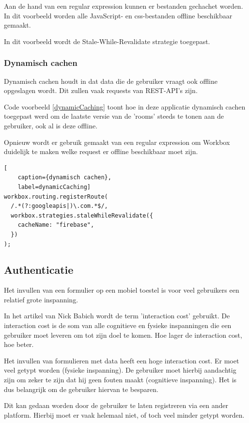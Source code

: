 			Aan de hand van een regular expression kunnen er bestanden gechachet worden. In dit voorbeeld worden alle JavaScript- en css-bestanden offline beschikbaar gemaakt.
			
			In dit voorbeeld wordt de Stale-While-Revalidate strategie toegepast.
			\autocite{Workbox2020b}
			
		\subsubsection{Dynamisch cachen}
			Dynamisch cachen houdt in dat data die de gebruiker vraagt ook offline opgeslagen wordt. Dit zullen vaak requests van REST-API's zijn.
			
			Code voorbeeld \ref{dynamicCaching} toont hoe in deze applicatie dynamisch cachen toegepast werd om de laatste versie van de 'rooms' steeds te tonen aan de gebruiker, ook al is deze offline.
			
			Opnieuw wordt er gebruik gemaakt van een regular expression om Workbox duidelijk te maken welke request er offline beschikbaar moet zijn.

\begin{lstlisting}[
	caption={dynamisch cachen},
	label=dynamicCaching]
workbox.routing.registerRoute(
  /.*(?:googleapis|)\.com.*$/,
  workbox.strategies.staleWhileRevalidate({
    cacheName: "firebase",
  })
);
\end{lstlisting}
	\subsection{Authenticatie}
		
		Het invullen van een formulier op een mobiel toestel is voor veel gebruikers een relatief grote inspanning.
		
		In het artikel van Nick Babich wordt de term 'interaction cost' gebruikt. De interaction cost is de som van alle cognitieve en fysieke inspanningen die een gebruiker moet leveren om tot zijn doel te komen. Hoe lager de interaction cost, hoe beter.
		\autocite{Babich2018}
		
		Het invullen van formulieren met data heeft een hoge interaction cost. Er moet veel getypt worden (fysieke inspanning). De gebruiker moet hierbij aandachtig zijn om zeker te zijn dat hij geen fouten maakt (cognitieve inspanning). Het is dus belangrijk om de gebruiker hiervan te besparen.
		
		Dit kan gedaan worden door de gebruiker te laten registreren via een ander platform. Hierbij moet er vaak helemaal niet, of toch veel minder getypt worden.
		
